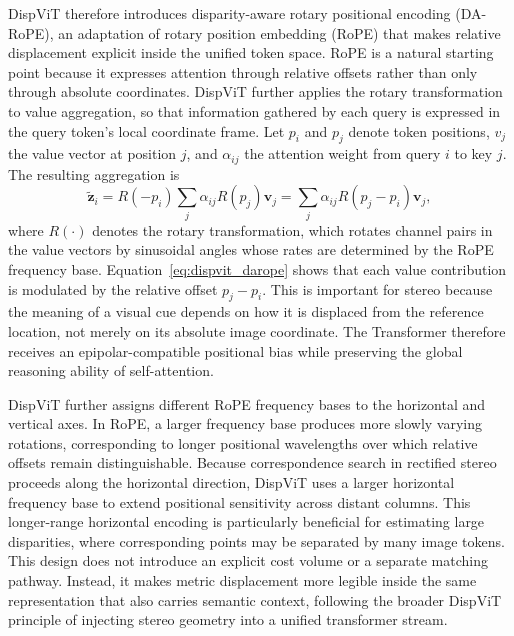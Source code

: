DispViT therefore introduces disparity-aware rotary positional encoding (DA-RoPE), an adaptation of rotary position embedding (RoPE) that makes relative displacement explicit inside the unified token space.
RoPE is a natural starting point because it expresses attention through relative offsets rather than only through absolute coordinates.
DispViT further applies the rotary transformation to value aggregation, so that information gathered by each query is expressed in the query token's local coordinate frame.
Let $p_i$ and $p_j$ denote token positions, $v_j$ the value vector at position $j$, and $\alpha_{ij}$ the attention weight from query $i$ to key $j$.
The resulting aggregation is
\begin{equation}
    \tilde{\bm{z}}_i
    =
    R(-p_i)\sum_j \alpha_{ij}R(p_j)\bm{v}_j
    =
    \sum_j \alpha_{ij}R(p_j-p_i)\bm{v}_j ,
    \label{eq:dispvit_darope}
\end{equation}
where $R(\cdot)$ denotes the rotary transformation, which rotates channel pairs in the value vectors by sinusoidal angles whose rates are determined by the RoPE frequency base.
Equation~\ref{eq:dispvit_darope} shows that each value contribution is modulated by the relative offset $p_j-p_i$.
This is important for stereo because the meaning of a visual cue depends on how it is displaced from the reference location, not merely on its absolute image coordinate.
The Transformer therefore receives an epipolar-compatible positional bias while preserving the global reasoning ability of self-attention.

DispViT further assigns different RoPE frequency bases to the horizontal and vertical axes.
In RoPE, a larger frequency base produces more slowly varying rotations, corresponding to longer positional wavelengths over which relative offsets remain distinguishable.
Because correspondence search in rectified stereo proceeds along the horizontal direction, DispViT uses a larger horizontal frequency base to extend positional sensitivity across distant columns.
This longer-range horizontal encoding is particularly beneficial for estimating large disparities, where corresponding points may be separated by many image tokens.
This design does not introduce an explicit cost volume or a separate matching pathway.
Instead, it makes metric displacement more legible inside the same representation that also carries semantic context, following the broader DispViT principle of injecting stereo geometry into a unified transformer stream.

